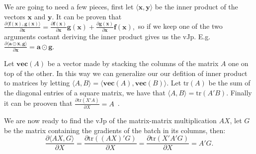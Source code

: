 \documentclass{article}
\newcommand{\trace}{\mathrm{tr}}
\newcommand{\partialfrac}[2]{\frac{\partial #1}{\partial #2}}
\newcommand{\vect}{\mathbf{vec}} %
\newcommand{\hadam}{\odot} %
\renewcommand\vec[1]{\mathbf{#1}}
\begin{document}
We are going to need a few pieces, first let \(\langle\vec x,\vec y\rangle\) be
the inner product of the vectors \(\vec x\) and \(\vec y.\) It can be proven
that \(\partialfrac{\langle\vec f(\vec x),\vec g(\vec x)\rangle}{\vec x}
= \partialfrac{\vec f(\vec x)}{\vec x} \vec g(\vec x)
	+ \partialfrac{\vec g(\vec x)}{\vec x} \vec f(\vec x),\) so if we keep one
of the two arguments costant deriving the inner product gives us the vJp. E.g.
\(\partialfrac{\langle\vec a \hadam \vec x,\vec g\rangle}{\vec x}
= \vec a \hadam \vec g.\)

Let \(\vect(A)\) be a vector made by stacking the columns of the matrix \(A\)
one on top of the other. In this way we can generalize our our defition of
inner product to matrices by letting \(\langle A,B\rangle =
\langle\vect(A),\vect(B)\rangle.\) Let \(\trace(A)\) be the sum of the diagonal
entries of a square matrix, we have that \(\langle A,B\rangle = \trace(A'B).\)
Finally it can be prooven that \(\partialfrac{\trace(X'A)}{X} =
A\)~\cite{cookbook,magnus}.

We are now ready to find the vJp of the matrix-matrix multiplication \(A X\),
let \(G\) be the matrix containing the gradients of the batch in its columns,
then: \[
\partialfrac{\langle AX,G\rangle}{X}
= \partialfrac{\trace((AX)'G)}{X}
= \partialfrac{\trace(X'A'G)}{X}
= A'G.\]



\end{document}
